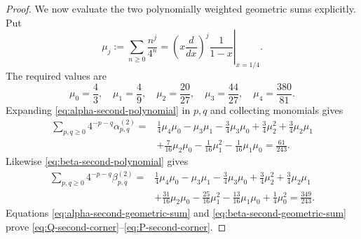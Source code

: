 \documentclass[10pt,a4paper]{amsart}
\begin{document}
\begin{proof}
We now evaluate the two polynomially weighted geometric sums explicitly.
Put
\begin{equation}
 \mu_j:=\sum_{n\ge0}\frac{n^j}{4^n}
 =\left.
 \left(x\frac{d}{dx}\right)^j\frac1{1-x}
 \right|_{x=1/4}.
 \label{eq:quarter-geometric-moments}
\end{equation}
The required values are
\begin{equation}
 \mu_0=\frac43,\quad \mu_1=\frac49,\quad
 \mu_2=\frac{20}{27},\quad \mu_3=\frac{44}{27},\quad
 \mu_4=\frac{380}{81}.
 \label{eq:quarter-moment-values}
\end{equation}
Expanding \eqref{eq:alpha-second-polynomial} in \(p,q\) and collecting
monomials gives
\begin{align}
 \sum_{p,q\ge0}4^{-p-q}\alpha^{(2)}_{p,q}
 ={}&
 \frac14\mu_4\mu_0-\mu_3\mu_1-\frac34\mu_3\mu_0
 +\frac34\mu_2^2+\frac34\mu_2\mu_1\nonumber\\
 &+\frac7{16}\mu_2\mu_0-\frac1{16}\mu_1^2
 -\frac1{16}\mu_1\mu_0
 =\frac{61}{243}.
 \label{eq:alpha-second-geometric-sum}
\end{align}
Likewise \eqref{eq:beta-second-polynomial} gives
\begin{align}
 \sum_{p,q\ge0}4^{-p-q}\beta^{(2)}_{p,q}
 ={}&
 \frac14\mu_4\mu_0-\mu_3\mu_1-\frac34\mu_3\mu_0
 +\frac34\mu_2^2+\frac34\mu_2\mu_1\nonumber\\
 &+\frac{31}{16}\mu_2\mu_0-\frac{25}{16}\mu_1^2
 -\frac{13}{16}\mu_1\mu_0+\frac14\mu_0^2
 =\frac{349}{243}.
 \label{eq:beta-second-geometric-sum}
\end{align}
Equations \eqref{eq:alpha-second-geometric-sum} and
\eqref{eq:beta-second-geometric-sum} prove
\eqref{eq:Q-second-corner}--\eqref{eq:P-second-corner}.


\end{proof}
\end{document}

